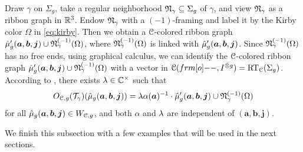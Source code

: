 \documentclass[11pt]{article}
\begin{document}
Draw $\gamma$ on $\Sigma_g$, take a regular neighborhood ${\mathfrak{N}}_\gamma\subseteq \Sigma_g$ of $\gamma$, and view ${\mathfrak{N}}_\gamma$ as a ribbon graph in ${\mathbb{R}}^3$. Endow ${\mathfrak{N}}_\gamma$ with a $(-1)$-framing and label it by the Kirby color $\Omega$ in \eqref{eq:kirby}. Then we obtain a $\mathcal{C}$-colored ribbon graph $\hat{\mu}'_{g}(\bm{a}, \bm{b}, \bm{j}) \cup {\mathfrak{N}}_{\gamma}^{(-1)}(\Omega)$, where ${\mathfrak{N}}_{\gamma}^{(-1)}(\Omega)$ is linked with $\hat{\mu}'_{g}(\bm{a}, \bm{b}, \bm{j})$. Since ${\mathfrak{N}}_{\gamma}^{(-1)}(\Omega)$ has no free ends, using graphical calculus, we can identify the $\mathcal{C}$-colored ribbon graph $\hat{\mu}'_{g}(\bm{a}, \bm{b}, \bm{j}) \cup {\mathfrak{N}}_{\gamma}^{(-1)}(\Omega)$ with a vector in $\cC(\1, I^{\o g})=\RTspace{\cC}{g}$. According to \cite[Ch.~IV]{Tur10}, there exists ${\lambda} \in {\mathbb{C}}^\times$ such that
\begin{equation}\label{eq:2-23}
\RTmat{\cC}{g}(\dt_\gamma)(\Wbase{g}{a}{b}{j}) = \ld\alpha(\bm{a})^{-1}\cdot  \hmu'_{g}(\bm{a}, \bm{b}, \bm{j}) \cup \fN_{\gamma}^{(-1)}(\Omega)
\end{equation}
for all ${\hat{\mu}_{g}(\bm{a}, \bm{b}, \bm{j})} \in W_{\mathcal{C},g}$, and both $\alpha$ and ${\lambda}$ are independent of $(\bm{a}, \bm{b}, \bm{j})$.

We finish this subsection with a few examples that will be used in the next sections.
\end{document}

